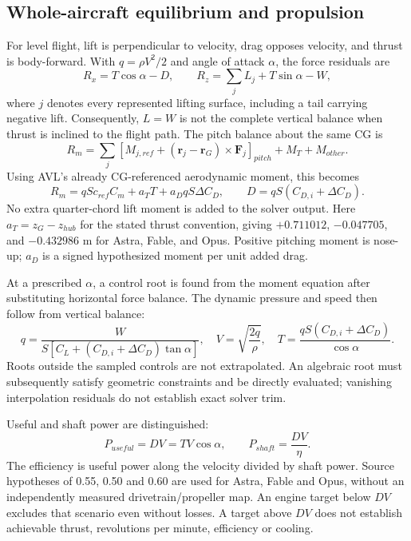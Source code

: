 \documentclass[11pt,a4paper]{article}
\begin{document}
\subsection{Whole-aircraft equilibrium and propulsion}
For level flight, lift is perpendicular to velocity, drag opposes velocity, and thrust is body-forward. With $q=\rho V^2/2$ and angle of attack $\alpha$, the force residuals are
\begin{equation}
R_x=T\cos\alpha-D,\qquad
R_z=\sum_j L_j+T\sin\alpha-W,
\label{eq:forces}
\end{equation}
where $j$ denotes every represented lifting surface, including a tail carrying negative lift. Consequently, $L=W$ is not the complete vertical balance when thrust is inclined to the flight path. The pitch balance about the same CG is
\begin{equation}
R_m=\sum_j\left[M_{j,ref}+(\boldsymbol r_j-\boldsymbol r_G)\times\boldsymbol F_j\right]_{pitch}
+M_T+M_{other}.
\label{eq:moments}
\end{equation}
Using AVL's already CG-referenced aerodynamic moment, this becomes
\begin{equation}
R_m=qSc_{ref}C_m+a_TT+a_DqS\Delta C_D,
\qquad D=qS(C_{D,i}+\Delta C_D).
\label{eq:solvermoment}
\end{equation}
No extra quarter-chord lift moment is added to the solver output. Here $a_T=z_G-z_{hub}$ for the stated thrust convention, giving $+0.711012$, $-0.047705$, and $-0.432986$ m for Astra, Fable, and Opus. Positive pitching moment is nose-up; $a_D$ is a signed hypothesized moment per unit added drag.

At a prescribed $\alpha$, a control root is found from the moment equation after substituting horizontal force balance. The dynamic pressure and speed then follow from vertical balance:
\begin{equation}
q=\frac{W}{S[C_L+(C_{D,i}+\Delta C_D)\tan\alpha]},\quad
V=\sqrt{\frac{2q}{\rho}},\quad
T=\frac{qS(C_{D,i}+\Delta C_D)}{\cos\alpha}.
\label{eq:trim}
\end{equation}
Roots outside the sampled controls are not extrapolated. An algebraic root must subsequently satisfy geometric constraints and be directly evaluated; vanishing interpolation residuals do not establish exact solver trim.

Useful and shaft power are distinguished:
\begin{equation}
P_{useful}=DV=TV\cos\alpha,\qquad
P_{shaft}=\frac{DV}{\eta}.
\label{eq:power}
\end{equation}
The efficiency is useful power along the velocity divided by shaft power. Source hypotheses of 0.55, 0.50 and 0.60 are used for Astra, Fable and Opus, without an independently measured drivetrain/propeller map. An engine target below $DV$ excludes that scenario even without losses. A target above $DV$ does not establish achievable thrust, revolutions per minute, efficiency or cooling.
\end{document}

